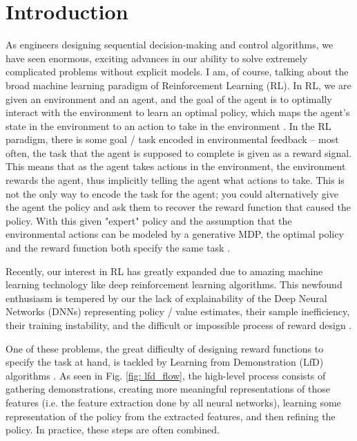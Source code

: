 \section{Introduction}

As engineers designing sequential decision-making and control algorithms, we have seen enormous, exciting advances in our ability to solve extremely complicated problems without explicit models. I am, of course, talking about the broad machine learning paradigm of Reinforcement Learning (RL). In RL, we are given an environment and an agent, and the goal of the agent is to optimally interact with the environment to learn an optimal policy, which maps the agent's state in the environment to an action to take in the environment \cite{Hussein2017}. In the RL paradigm, there is some goal / task encoded in environmental feedback -- most often, the task that the agent is supposed to complete is given as a reward signal. This means that as the agent takes actions in the environment, the environment rewards the agent, thus implicitly telling the agent what actions to take. This is not the only way to encode the task for the agent; you could alternatively give the agent the policy and ask them to recover the reward function that caused the policy. With this given "expert" policy and the assumption that the environmental actions can be modeled by a generative MDP, the optimal policy and the reward function both specify the same task \cite{NG_IRL}.

Recently, our interest in RL has greatly expanded due to amazing machine learning technology like deep reinforcement learning algorithms. This newfound enthusiasm is tempered by our the lack of explainability of the Deep Neural Networks (DNNs) representing policy / value estimates, their sample inefficiency, their training instability, and the difficult or impossible process of reward design \cite{rlblogpost}.

One of these problems, the great difficulty of designing reward functions to specify the task at hand, is tackled by Learning from Demonstration (LfD) algorithms \cite{Ravichandar2020}. As seen in Fig. \ref{fig: lfd_flow}, the high-level process consists of gathering demonstrations, creating more meaningful representations of those features (i.e. the feature extraction done by all neural networks), learning some representation of the policy from the extracted features, and then refining the policy. In practice, these steps are often combined.

